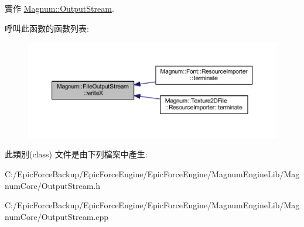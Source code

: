 實作 \hyperlink{class_magnum_1_1_output_stream_a6fee68b5bf33dab5c2674b2ff8e850be}{Magnum\+::\+Output\+Stream}.



呼叫此函數的函數列表\+:\nopagebreak
\begin{figure}[H]
\begin{center}
\leavevmode
\includegraphics[width=350pt]{class_magnum_1_1_file_output_stream_ab3d24c893812e35318b3a535880465fb_icgraph}
\end{center}
\end{figure}




此類別(class) 文件是由下列檔案中產生\+:\begin{DoxyCompactItemize}
\item 
C\+:/\+Epic\+Force\+Backup/\+Epic\+Force\+Engine/\+Epic\+Force\+Engine/\+Magnum\+Engine\+Lib/\+Magnum\+Core/Output\+Stream.\+h\item 
C\+:/\+Epic\+Force\+Backup/\+Epic\+Force\+Engine/\+Epic\+Force\+Engine/\+Magnum\+Engine\+Lib/\+Magnum\+Core/Output\+Stream.\+cpp\end{DoxyCompactItemize}
